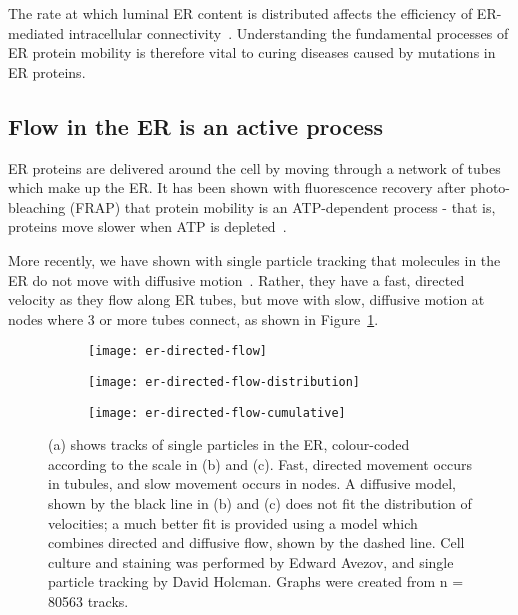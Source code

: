 The rate at which luminal ER content is distributed affects the efficiency of ER-mediated intracellular connectivity~\cite{hubner2014membrane, blackstone2011hereditary}. 
Understanding the fundamental processes of ER protein mobility is therefore vital to curing diseases caused by mutations in ER proteins.

\subsection{Flow in the ER is an active process}
ER proteins are delivered around the cell by moving through a network of tubes which make up the ER. 
It has been shown with fluorescence recovery after photo-bleaching (FRAP) that protein mobility is an ATP-dependent process - that is, proteins move slower when ATP is depleted~\cite{dayel1999diffusion, nehls2000dynamics}.

More recently, we have shown with single particle tracking that molecules in the ER do not move with diffusive motion~\cite{holcman2018single}. 
Rather, they have a fast, directed velocity as they flow along ER tubes, but move with slow, diffusive motion at nodes where 3 or more tubes connect, as shown in Figure~\ref{fig:er-directed-flow-velocity}. 

\begin{figure}[htbp!]
\centering
	\begin{subfigure}[b]{0.4\textwidth}
		\texttt{[image: er-directed-flow]}
		\caption{} \label{fig:er-directed-flow-velocity}
	\end{subfigure}	
	\hfill
	\begin{subfigure}[b]{0.29\textwidth}
		\texttt{[image: er-directed-flow-distribution]}
		\caption{} \label{fig:er-directed-flow-distribution}
	\end{subfigure}
	\hfill
	\begin{subfigure}[b]{0.29\textwidth}
		\texttt{[image: er-directed-flow-cumulative]}
		\caption{} \label{fig:er-directed-flow-cumulative}
	\end{subfigure}	
\caption[ER: Single particle tracking reveals directed flow in ER tubules]{(a) shows tracks of single particles in the ER, colour-coded according to the scale in (b) and (c). Fast, directed movement occurs in tubules, and slow movement occurs in nodes. A diffusive model, shown by the black line in (b) and (c) does not fit the distribution of velocities; a much better fit is provided using a model which combines directed and diffusive flow, shown by the dashed line. Cell culture and staining was performed by Edward Avezov, and single particle tracking by David Holcman. Graphs were created from n = \num{80563} tracks. } 
\label{fig:ER-directed-flow-velocity}
\end{figure}

